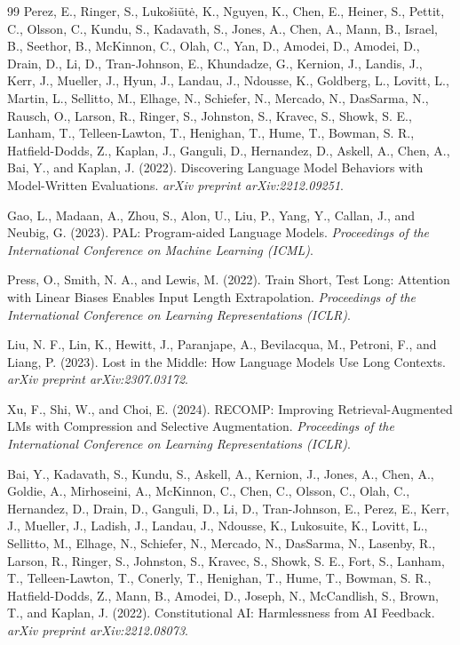 \documentclass[11pt]{article}
\begin{document}
\begin{thebibliography}{99}
Perez, E., Ringer, S., Lukošiūtė, K., Nguyen, K., Chen, E., Heiner, S., Pettit, C., Olsson, C., Kundu, S., Kadavath, S., Jones, A., Chen, A., Mann, B., Israel, B., Seethor, B., McKinnon, C., Olah, C., Yan, D., Amodei, D., Amodei, D., Drain, D., Li, D., Tran-Johnson, E., Khundadze, G., Kernion, J., Landis, J., Kerr, J., Mueller, J., Hyun, J., Landau, J., Ndousse, K., Goldberg, L., Lovitt, L., Martin, L., Sellitto, M., Elhage, N., Schiefer, N., Mercado, N., DasSarma, N., Rausch, O., Larson, R., Ringer, S., Johnston, S., Kravec, S., Showk, S. E., Lanham, T., Telleen-Lawton, T., Henighan, T., Hume, T., Bowman, S. R., Hatfield-Dodds, Z., Kaplan, J., Ganguli, D., Hernandez, D., Askell, A., Chen, A., Bai, Y., and Kaplan, J. (2022).
\newblock Discovering Language Model Behaviors with Model-Written Evaluations.
\newblock \emph{arXiv preprint arXiv:2212.09251}.

Gao, L., Madaan, A., Zhou, S., Alon, U., Liu, P., Yang, Y., Callan, J., and Neubig, G. (2023).
\newblock PAL: Program-aided Language Models.
\newblock \emph{Proceedings of the International Conference on Machine Learning (ICML)}.

Press, O., Smith, N. A., and Lewis, M. (2022).
\newblock Train Short, Test Long: Attention with Linear Biases Enables Input Length Extrapolation.
\newblock \emph{Proceedings of the International Conference on Learning Representations (ICLR)}.

Liu, N. F., Lin, K., Hewitt, J., Paranjape, A., Bevilacqua, M., Petroni, F., and Liang, P. (2023).
\newblock Lost in the Middle: How Language Models Use Long Contexts.
\newblock \emph{arXiv preprint arXiv:2307.03172}.

Xu, F., Shi, W., and Choi, E. (2024).
\newblock RECOMP: Improving Retrieval-Augmented LMs with Compression and Selective Augmentation.
\newblock \emph{Proceedings of the International Conference on Learning Representations (ICLR)}.

Bai, Y., Kadavath, S., Kundu, S., Askell, A., Kernion, J., Jones, A., Chen, A., Goldie, A., Mirhoseini, A., McKinnon, C., Chen, C., Olsson, C., Olah, C., Hernandez, D., Drain, D., Ganguli, D., Li, D., Tran-Johnson, E., Perez, E., Kerr, J., Mueller, J., Ladish, J., Landau, J., Ndousse, K., Lukosuite, K., Lovitt, L., Sellitto, M., Elhage, N., Schiefer, N., Mercado, N., DasSarma, N., Lasenby, R., Larson, R., Ringer, S., Johnston, S., Kravec, S., Showk, S. E., Fort, S., Lanham, T., Telleen-Lawton, T., Conerly, T., Henighan, T., Hume, T., Bowman, S. R., Hatfield-Dodds, Z., Mann, B., Amodei, D., Joseph, N., McCandlish, S., Brown, T., and Kaplan, J. (2022).
\newblock Constitutional AI: Harmlessness from AI Feedback.
\newblock \emph{arXiv preprint arXiv:2212.08073}.


\end{thebibliography}
\end{document}
